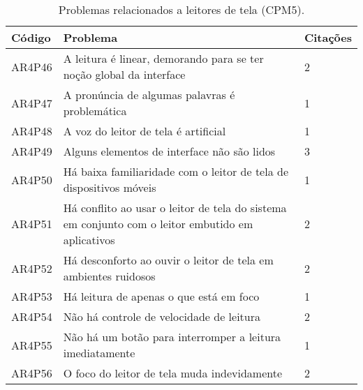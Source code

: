 \begin{table}[htb]
  \begin{center}
    \ABNTEXfontereduzida
    \caption{Problemas relacionados a leitores de tela (CPM5).}
    \label{tab-pro-lei-tel-1}
    \begin{tabular}{p{1.2cm}|p{12.0cm}|p{1.4cm}}
      \textbf{Código} & \textbf{Problema}                                                                                & \textbf{Citações} \\
      \hline
      AR4P46          & A leitura é linear, demorando para se ter noção global da interface                              & 2                 \\
      \hline
      AR4P47          & A pronúncia de algumas palavras é problemática                                                   & 1                 \\
      \hline
      AR4P48          & A voz do leitor de tela é artificial                                                             & 1                 \\
      \hline
      AR4P49          & Alguns elementos de interface não são lidos                                                      & 3                 \\
      \hline
      AR4P50          & Há baixa familiaridade com o leitor de tela de dispositivos móveis                               & 1                 \\
      \hline
      AR4P51          & Há conflito ao usar o leitor de tela do sistema em conjunto com o leitor embutido em aplicativos & 2                 \\
      \hline
      AR4P52          & Há desconforto ao ouvir o leitor de tela em ambientes ruidosos                                   & 2                 \\
      \hline
      AR4P53          & Há leitura de apenas o que está em foco                                                          & 1                 \\
      \hline
      AR4P54          & Não há controle de velocidade de leitura                                                         & 2                 \\
      \hline
      AR4P55          & Não há um botão para interromper a leitura imediatamente                                         & 1                 \\
      \hline
      AR4P56          & O foco do leitor de tela muda indevidamente                                                      & 2                 \\

\end{tabular}
\end{center}
\end{table}
